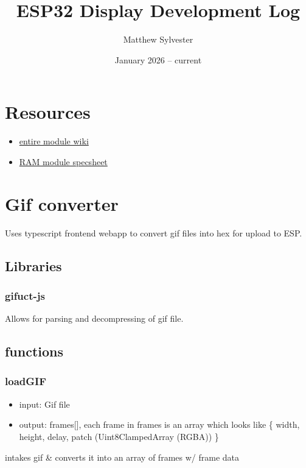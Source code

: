 \documentclass{article}
\title{ESP32 Display Development Log}
\author{Matthew Sylvester}
\date{January 2026 -- current}
\begin{document}
\maketitle

\section{Resources}

\begin{itemize}
\item \href{https://www.waveshare.com/wiki/ESP32-S3-Touch-LCD-1.28}{entire module wiki}
\item \href{https://www.winbond.com/resource-files/w25q128jv%20revf%2003272018%20plus.pdf#page=4.14}{RAM module specsheet}
\end{itemize}

\section{Gif converter}

Uses typescript frontend webapp to convert gif files into hex for upload to ESP.

\subsection{Libraries}

\subsubsection{gifuct-js}

Allows for parsing and decompressing of gif file.

\subsection{functions}

\subsubsection{loadGIF}
\begin{itemize}
\item input: Gif file
\item output: frames[], each frame in frames is an array which looks like \{
  width,
  height,
  delay,
  patch (Uint8ClampedArray (RGBA))
\}
\end{itemize}

intakes gif \& converts it into an array of frames w/ frame data
\end{document}
